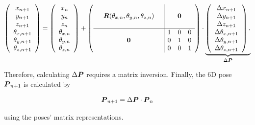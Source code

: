 \documentclass[12pt,dvips]{article}
\renewcommand{\v}[1]{\text{\boldmath $#1$}}
\newcommand{\V}[1]{\text{\boldmath $#1$}}
\newcommand{\M}[1]{\v{#1}}                     %
\begin{document}
{\begin{itemize}
\begin{small}
\begin{eqnarray}
\left(
\begin{array}{c}
x_{n+1} \\
y_{n+1} \\
z_{n+1} \\
{\theta_{x,{n+1}}} \\
{\theta_{y,{n+1}}} \\
{\theta_{z,{n+1}}} \\
\end{array}
\right)
=
\left(
\begin{array}{c}
x_{n} \\
y_{n} \\
z_{n} \\
{\theta_{x,{n}}} \\
{\theta_{y,{n}}} \\
{\theta_{z,{n}}} \\
\end{array}
\right)
+
\left(
\begin{array}{ccc|ccc}
   &        &   &   &      & \\
   &  \M R({\theta_{x,{n}}},{\theta_{y,{n}}}, {\theta_{z,{n}}}) &   &   & \M 0 &
\\
   &        &   &   &      & \\
\hline
   &       &    & 1 & 0    & 0 \\
   & \M 0  &    & 0 & 1    & 0 \\
   &       &    & 0 & 0    & 1 \\
\end{array}
\right)
\cdot
\underbrace{\left(
\begin{array}{c}
\Delta x_{n+1} \\
\Delta y_{n+1} \\
\Delta z_{n+1} \\
\Delta {\theta_{x,{n+1}}} \\
\Delta {\theta_{y,{n+1}}} \\
\Delta {\theta_{z,{n+1}}} \\
\end{array}
\right).}_{\Delta \V P} \label{PosUpdate6D}
\label{extrapol}
\end{eqnarray}
\end{small}

Therefore, calculating $\Delta \V P$ requires a matrix
inversion. Finally, the 6D pose $\M P_{n+1}$ is calculated by
\vspace*{-2mm}
\begin{small}
\begin{eqnarray*}\label{inital6DPose}
\M P_{n+1} = \Delta \M P \cdot \M P_{n}
\end{eqnarray*}
\end{small}
using the poses' matrix representations.\\[-1.5ex]



\end{itemize}}
\end{document}
